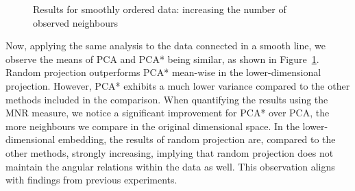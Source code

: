 \documentclass[pdftex,12pt,a4paper]{report}
\begin{document}
\begin{figure}[!htb]
    \caption{Results for smoothly ordered data: increasing the number of observed neighbours}\label{fig:num_neigh_oneline}
\end{figure}

Now, applying the same analysis to the data connected in a smooth line, we observe the means of PCA and PCA* being similar, as shown in Figure~\ref{fig:num_neigh_oneline}.
Random projection outperforms PCA* mean-wise in the lower-dimensional projection.
However, PCA* exhibits a much lower variance compared to the other methods included in the comparison.
When quantifying the results using the MNR measure, we notice a significant improvement for PCA* over PCA, the more neighbours we compare in the original dimensional space.
In the lower-dimensional embedding, the results of random projection are, compared to the other methods, strongly increasing, implying that random projection does not maintain the angular relations within the data as well.
This observation aligns with findings from previous experiments.
\end{document}

